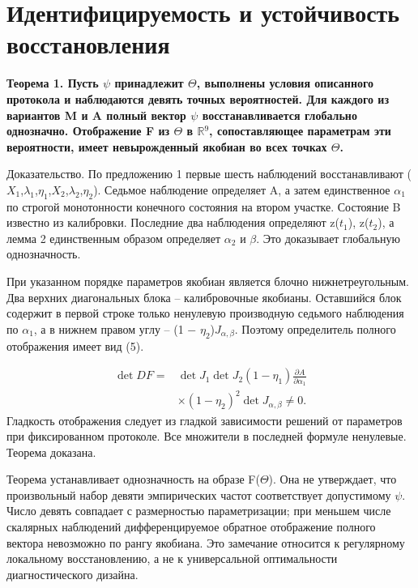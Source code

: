 \documentclass[blind]{psta}
\begin{document}
\FloatBarrier
\section{Идентифицируемость и устойчивость восстановления}
\par\medskip\noindent\textbf{Теорема 1. Пусть $\psi$ принадлежит $\Theta$, выполнены условия описанного протокола и наблюдаются девять точных вероятностей. Для каждого из вариантов M и A полный вектор $\psi$ восстанавливается глобально однозначно. Отображение F из $\Theta$ в $\mathbb{R}$$^{9}$, сопоставляющее параметрам эти вероятности, имеет невырожденный якобиан во всех точках $\Theta$.}\par\smallskip
Доказательство. По предложению 1 первые шесть наблюдений восстанавливают ($X_{1}$,$\lambda_{1}$,$\eta_{1}$,$X_{2}$,$\lambda_{2}$,$\eta_{2}$). Седьмое наблюдение определяет A, а затем единственное $\alpha_{1}$ по строгой монотонности конечного состояния на втором участке. Состояние B известно из калибровки. Последние два наблюдения определяют z($t_{1}$), z($t_{2}$), а лемма 2 единственным образом определяет $\alpha_{2}$ и $\beta$. Это доказывает глобальную однозначность.

При указанном порядке параметров якобиан является блочно нижнетреугольным. Два верхних диагональных блока – калибровочные якобианы. Оставшийся блок содержит в первой строке только ненулевую производную седьмого наблюдения по $\alpha_{1}$, а в нижнем правом углу – (1 $-$ $\eta_{2}$)$J_{\alpha,\beta}$. Поэтому определитель полного отображения имеет вид (5).

\begin{equation}
\begin{aligned}\det DF=&\det J_1\det J_2(1-\eta_1)\frac{\partial A}{\partial\alpha_1}\\&\times(1-\eta_2)^2\det J_{\alpha,\beta}\ne0.\end{aligned}
\tag{5}
\label{eq:5}
\end{equation}
Гладкость отображения следует из гладкой зависимости решений от параметров при фиксированном протоколе. Все множители в последней формуле ненулевые. Теорема доказана.

Теорема устанавливает однозначность на образе F($\Theta$). Она не утверждает, что произвольный набор девяти эмпирических частот соответствует допустимому $\psi$. Число девять совпадает с размерностью параметризации; при меньшем числе скалярных наблюдений дифференцируемое обратное отображение полного вектора невозможно по рангу якобиана. Это замечание относится к регулярному локальному восстановлению, а не к универсальной оптимальности диагностического дизайна.
\end{document}
